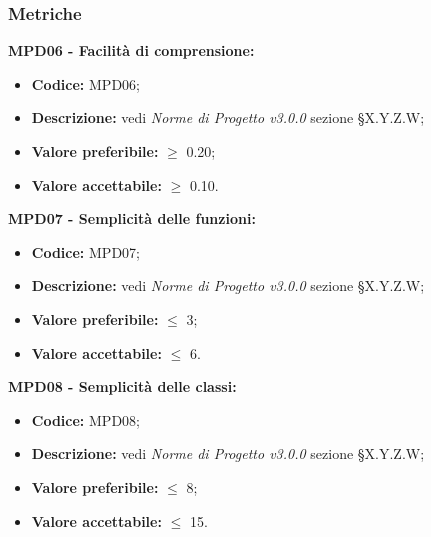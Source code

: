 \subsubsection{Metriche}
\textbf{MPD06 - Facilità di comprensione:}
\begin{itemize}
    \item \textbf{Codice:} MPD06;
    \item \textbf{Descrizione:} vedi \textit{Norme di Progetto v3.0.0} sezione \S X.Y.Z.W;
    \item \textbf{Valore preferibile:} $\geq$ 0.20;
    \item \textbf{Valore accettabile:} $\geq$ 0.10.
\end{itemize}
\textbf{MPD07 - Semplicità delle funzioni:}
\begin{itemize}
    \item \textbf{Codice:} MPD07;
    \item \textbf{Descrizione:} vedi \textit{Norme di Progetto v3.0.0} sezione \S X.Y.Z.W;
    \item \textbf{Valore preferibile:} $\leq$ 3;
    \item \textbf{Valore accettabile:} $\leq$ 6.
\end{itemize}
\textbf{MPD08 - Semplicità delle classi:}
\begin{itemize}
    \item \textbf{Codice:} MPD08;
    \item \textbf{Descrizione:} vedi \textit{Norme di Progetto v3.0.0} sezione \S X.Y.Z.W;
    \item \textbf{Valore preferibile:} $\leq$ 8;
    \item \textbf{Valore accettabile:} $\leq$ 15.
\end{itemize}

